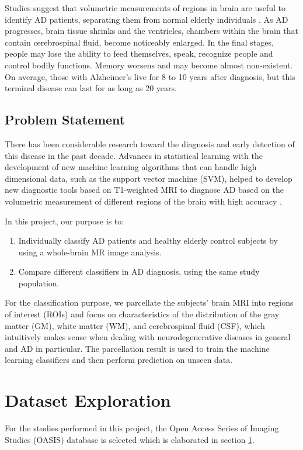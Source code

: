 Studies suggest that volumetric measurements of regions in brain are useful to identify AD patients, separating them from normal elderly individuals \cite{bottino2002volumetric}. As AD progresses, brain tissue shrinks and the ventricles, chambers within the brain that contain cerebrospinal fluid, become noticeably enlarged. In the final stages, people may lose the ability to feed themselves, speak, recognize people and control bodily functions. Memory worsens and may become almost non-existent. On average, those with Alzheimer's live for 8 to 10 years after diagnosis, but this terminal disease can last for as long as 20 years.

\subsection{Problem Statement}
There has been considerable research toward the diagnosis and early detection of this disease in the past decade. Advances in statistical learning with the development of new machine learning algorithms that can handle high dimensional data, such as the support vector machine (SVM), helped to develop new diagnostic tools based on T1-weighted MRI to diagnose AD based on the volumetric measurement of different regions of the brain with high accuracy \cite{cuingnet2011automatic}.

In this project, our purpose is to:
\begin{enumerate}
	\item Individually classify AD patients and healthy elderly control subjects by using a whole-brain MR image analysis.
	\item Compare different classifiers in AD diagnosis, using the same study population.
\end{enumerate}

For the classification purpose, we parcellate the subjects’ brain MRI into regions of interest (ROIs) and focus on characteristics of the distribution of the gray matter (GM), white matter (WM), and cerebrospinal fluid (CSF), which intuitively makes sense when dealing with neurodegenerative diseases in general and AD in particular. The parcellation result is used to train the machine learning classifiers and then perform prediction on unseen data.


\section{Dataset Exploration}
\label{sec:oasis}
For the studies performed in this project, the Open Access Series of Imaging Studies (OASIS) database is selected which is elaborated in section \ref{sec:oasis}. 

